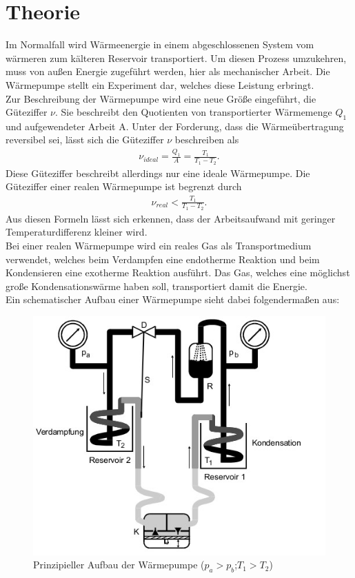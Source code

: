 \section{Theorie} \label{sec:2}\justifying
Im Normalfall wird Wärmeenergie in einem abgeschlossenen System vom wärmeren zum kälteren Reservoir transportiert. Um diesen Prozess 
umzukehren, muss von außen Energie zugeführt werden, hier als mechanischer Arbeit.
Die Wärmepumpe stellt ein Experiment dar, welches diese Leistung erbringt. \\
Zur Beschreibung der Wärmepumpe wird eine neue Größe eingeführt, die Güteziffer $\nu$.
Sie beschreibt den Quotienten von transportierter Wärmemenge $Q_1$ und aufgewendeter
Arbeit A. Unter der Forderung, dass die Wärmeübertragung reversibel sei, lässt
sich die Güteziffer $\nu$ beschreiben als \cite{V206}
\begin{align}
    \nu _{ideal} = \frac{Q_1}{A}=\frac{T_1}{T_1-T_2}. \label{eq:1}
\end{align}
Diese Güteziffer beschreibt allerdings nur eine ideale Wärmepumpe. Die
Güteziffer einer realen Wärmepumpe ist begrenzt durch \cite{V206}
\begin{align}
    \nu _{real} < \frac{T_1}{T_1-T_2}. \label{eq:2}
\end{align}
Aus diesen Formeln  lässt sich erkennen, dass der Arbeitsaufwand mit geringer 
Temperaturdifferenz kleiner wird.\\
Bei einer realen Wärmepumpe wird ein reales Gas als Transportmedium verwendet, welches
beim Verdampfen eine endotherme Reaktion und beim Kondensieren eine exotherme Reaktion
ausführt. Das Gas, welches eine möglichst große Kondensationswärme haben soll, transportiert
damit die Energie.\\
Ein schematischer Aufbau einer Wärmepumpe sieht dabei folgendermaßen aus:
\begin{figure}[H]
    \centering
    \includegraphics[width=0.75\linewidth]{./images/theo_Aufbau.jpg}
    \caption{Prinzipieller Aufbau der Wärmepumpe ($p_a>p_b$;$T_1>T_2$) \cite{V206}} 
    \label{fig:1}
\end{figure}
